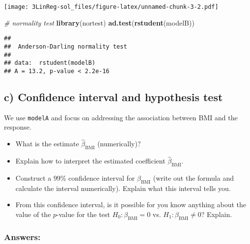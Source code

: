 \documentclass[]{article}
\newenvironment{Shaded}{\begin{snugshade}}{\end{snugshade}}
\newcommand{\KeywordTok}[1]{\textcolor[rgb]{0.13,0.29,0.53}{\textbf{#1}}}
\newcommand{\CommentTok}[1]{\textcolor[rgb]{0.56,0.35,0.01}{\textit{#1}}}
\newcommand{\NormalTok}[1]{#1}
\providecommand{\tightlist}{%
  \setlength{\itemsep}{0pt}\setlength{\parskip}{0pt}}
\begin{document}
\texttt{[image: 3LinReg-sol\_files/figure-latex/unnamed-chunk-3-2.pdf]}

\begin{Shaded}
\begin{Highlighting}[]
\CommentTok{# normality test}
\KeywordTok{library}\NormalTok{(nortest) }
\KeywordTok{ad.test}\NormalTok{(}\KeywordTok{rstudent}\NormalTok{(modelB))}
\end{Highlighting}
\end{Shaded}

\begin{verbatim}
## 
##  Anderson-Darling normality test
## 
## data:  rstudent(modelB)
## A = 13.2, p-value < 2.2e-16
\end{verbatim}

\subsection{c) Confidence interval and hypothesis
test}\label{c-confidence-interval-and-hypothesis-test}

We use \texttt{modelA} and focus on addressing the association between
BMI and the response.

\begin{itemize}
\tightlist
\item
  What is the estimate \(\hat{\beta}_{\text{BMI}}\) (numerically)?
\item
  Explain how to interpret the estimated coefficient
  \(\hat{\beta}_{\text{BMI}}\).
\item
  Construct a 99\% confidence interval for \(\beta_{\text{BMI}}\) (write
  out the formula and calculate the interval numerically). Explain what
  this interval tells you.
\item
  From this confidence interval, is it possible for you know anything
  about the value of the \(p\)-value for the test
  \(H_0: \beta_{\text{BMI}}=0\) vs. \(H_1:\beta_{\text{BMI}} \neq 0\)?
  Explain.
\end{itemize}

\subsubsection{Answers:}\label{answers-2}
\end{document}
